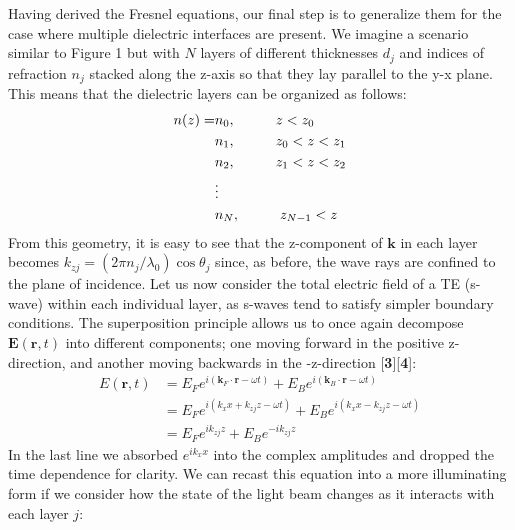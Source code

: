 \documentclass[preprint, onecolumn, amsmath, amssymb, aps]{revtex4-1}
\numberwithin{equation}{section}
\begin{document}
Having derived the Fresnel equations, our final step is to generalize them for the case where multiple dielectric interfaces are present. We imagine a scenario similar to Figure 1 but with $N$ layers of different thicknesses $d_{j}$ and indices of refraction $n_{j}$ stacked along the z-axis so that they lay parallel to the y-x plane. This means that the dielectric layers can be organized as follows:
\begin{align}\label{layers}
n(z) =& n_{0}, \hspace{10mm} z < z_{0}                  \nonumber \\
	  & n_{1}, \hspace{10mm} z_{0} < z < z_{1}           \nonumber \\
 	  & n_{2}, \hspace{10mm} z_{1} < z < z_{2}            \nonumber \\
 	  & \vdots                                             \nonumber \\ 	
 	  & n_{N}, \hspace{10mm} z_{N - 1} < z                  \nonumber \\	 
\end{align}
\noindent
From this geometry, it is easy to see that the z-component of $\mathbf{k}$ in each layer becomes $k_{z j} = (2 \pi n_{j} / \lambda_{0}) \cos \theta_{j}$ since, as before, the wave rays are confined to the plane of incidence. Let us now consider the total electric field of a TE (s-wave) within each individual layer, as s-waves tend to satisfy simpler boundary conditions. The superposition principle allows us to once again decompose $\mathbf{E}(\mathbf{r}, t)$ into different components; one moving forward in the positive z-direction, and another moving backwards in the -z-direction [\textbf{3}][\textbf{4}]:
\begin{align}
E(\mathbf{r}, t)  &=  E_{F} e^{ i ( \mathbf{k}_{F} \cdot \mathbf{r} - \omega t) } + E_{B} e^{ i ( \mathbf{k}_{B} \cdot \mathbf{r} - \omega t) }          \nonumber \\
   	              &= E_{F} e^{ i ( k_{x} x + k_{zj} z - \omega t) } + E_{B} e^{ i ( k_{x} x - k_{zj} z - \omega t) }           \nonumber \\
             	  &=  E_{F} e^{ i k_{zj} z } + E_{B} e^{ -i  k_{zj} z }                                   
\end{align}
\noindent
In the last line we absorbed $e^{ i k_{x} x }$ into the complex amplitudes and dropped the time dependence for clarity. We can recast this equation into a more illuminating form if we consider how the state of the light beam changes as it interacts with each layer $j$:
\end{document}
